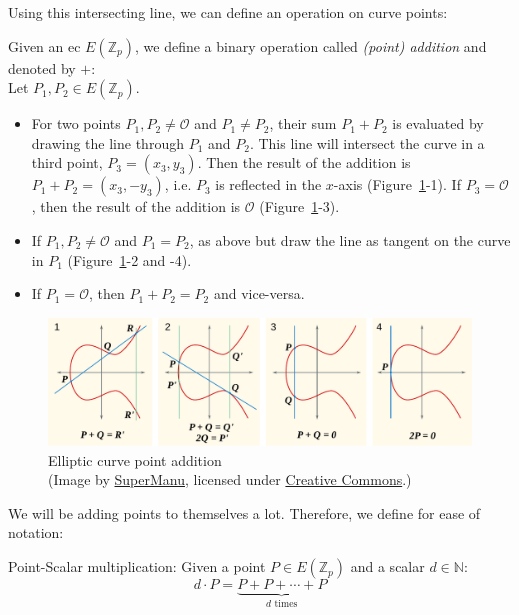 Using this intersecting line, we can define an operation on curve points:
\begin{definition}
    \label{def:point-add}
    Given an \gls{ec} $E(\mathbb{Z}_p)$, we define a binary operation called \emph{(point) addition} and denoted by $+$:~\cite{katz_introduction_2015}\\
    Let $P_1, P_2 \in E(\mathbb{Z}_p)$.

    \begin{itemize}
        \item For two points $P_1, P_2 \neq \mathcal{O}$ and $P_1 \neq P_2$, their sum $P_1 + P_2$ is evaluated by drawing the line through $P_1$ and $P_2$. 
            This line will intersect the curve in a third point, $P_3 = (x_3, y_3)$.
            Then the result of the addition is $P_1 + P_2 = (x_3, -y_3)$, i.e. $P_3$ is reflected in the $x$-axis (Figure~\ref{fig:ecc-point-addition}-1).
            If $P_3 = \mathcal{O}$, then the result of the addition is $\mathcal{O}$ (Figure~\ref{fig:ecc-point-addition}-3).
        \item If $P_1, P_2 \neq \mathcal{O}$ and $P_1 = P_2$, as above but draw the line as tangent on the curve in $P_1$ (Figure~\ref{fig:ecc-point-addition}-2 and -4).
        \item If $P_1 = \mathcal{O}$, then $P_1 + P_2 = P_2$ and vice-versa.
    \end{itemize}
\end{definition} 

\begin{figure}
    \includegraphics[width=\textwidth]{figures/ecc_point_addition.pdf}
    \caption[Elliptic curve point addition]{Elliptic curve point addition\\(Image by \href{https://commons.wikimedia.org/wiki/File:ECClines-2.svg}{SuperManu}, licensed under \href{https://creativecommons.org/licenses/by-sa/3.0/deed.en}{Creative Commons}.)}
    \label{fig:ecc-point-addition}
\end{figure}

We will be adding points to themselves a lot. Therefore, we define for ease of notation:
\begin{definition}
    Point-Scalar multiplication: Given a point $P \in E(\mathbb{Z}_p)$ and a scalar $d \in \mathbb{N}$: 
    \begin{equation}
        d \cdot P = \underbrace{P + P + \cdots + P}_{d \text{ times}}
    \end{equation}
\end{definition}
 
